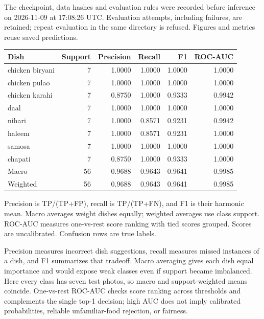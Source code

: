 \documentclass[10pt,a4paper]{article}
\begin{document}
The checkpoint, data hashes and evaluation rules were recorded before inference on 2026-11-09 at 17:08:26 UTC. Evaluation attempts, including failures, are retained; repeat evaluation in the same directory is refused. Figures and metrics reuse saved predictions.

\begin{center}\footnotesize\setlength{\tabcolsep}{4pt}
\begin{tabularx}{\linewidth}{Xrrrrr}
\toprule
Dish & Support & Precision & Recall & F1 & ROC-AUC \\
\midrule
chicken biryani & 7 & 1.0000 & 1.0000 & 1.0000 & 1.0000 \\
chicken pulao & 7 & 1.0000 & 1.0000 & 1.0000 & 1.0000 \\
chicken karahi & 7 & 0.8750 & 1.0000 & 0.9333 & 0.9942 \\
daal & 7 & 1.0000 & 1.0000 & 1.0000 & 1.0000 \\
nihari & 7 & 1.0000 & 0.8571 & 0.9231 & 0.9942 \\
haleem & 7 & 1.0000 & 0.8571 & 0.9231 & 1.0000 \\
samosa & 7 & 1.0000 & 1.0000 & 1.0000 & 1.0000 \\
chapati & 7 & 0.8750 & 1.0000 & 0.9333 & 1.0000 \\
Macro & 56 & 0.9688 & 0.9643 & 0.9641 & 0.9985 \\
Weighted & 56 & 0.9688 & 0.9643 & 0.9641 & 0.9985 \\
\bottomrule\end{tabularx}\end{center}
Precision is TP/(TP+FP), recall is TP/(TP+FN), and F1 is their harmonic mean. Macro averages weight dishes equally; weighted averages use class support. ROC-AUC measures one-vs-rest score ranking with tied scores grouped. Scores are uncalibrated. Confusion rows are true labels.

Precision measures incorrect dish suggestions, recall measures missed instances of a dish, and F1 summarizes that tradeoff. Macro averaging gives each dish equal importance and would expose weak classes even if support became imbalanced. Here every class has seven test photos, so macro and support-weighted means coincide. One-vs-rest ROC-AUC checks score ranking across thresholds and complements the single top-1 decision; high AUC does not imply calibrated probabilities, reliable unfamiliar-food rejection, or fairness.
\end{document}

